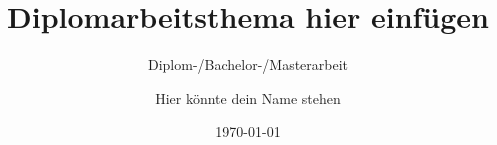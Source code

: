 \titlehead{\centering\texttt{[image: htw-logo]}}%
\subject{Hochschule für Technik und Wirtschaft Dresden\\%
		Fakultät hier einfügen}%
\title{Diplomarbeitsthema hier einfügen}%
\subtitle{Diplom-/Bachelor-/Masterarbeit}%
\author{Hier könnte dein Name stehen}%
\date{\today}%
\publishers{Betreuer usw.}%
\maketitle%
\newpage%